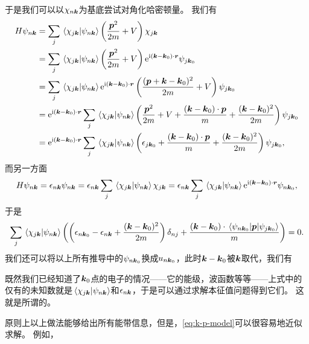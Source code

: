 于是我们可以以$\chi_{n \vb*{k}}$为基底尝试对角化哈密顿量。
我们有
\[
    \begin{aligned}
        H \psi_{n \vb*{k}} &= \sum_j \braket*{\chi_{j \vb*{k}}}{\psi_{n \vb*{k}}} \left( \frac{\vb*{p}^2}{2m} + V \right) \chi_{j \vb*{k}} \\
        &= \sum_j \braket*{\chi_{j \vb*{k}}}{\psi_{n \vb*{k}}} \left( \frac{\vb*{p}^2}{2m} + V \right) \mathrm{e}^{\mathrm{i} (\vb*{k} - \vb*{k}_0) \cdot \vb*{r}} \psi_{j \vb*{k}_0} \\
        &= \sum_j \braket*{\chi_{j \vb*{k}}}{\psi_{n \vb*{k}}} \mathrm{e}^{\mathrm{i} (\vb*{k} - \vb*{k}_0) \cdot \vb*{r}} \left( \frac{(\vb*{p} + \vb*{k} - \vb*{k}_0)^2}{2m} + V \right) \psi_{j \vb*{k}_0} \\
        &= \mathrm{e}^{\mathrm{i} (\vb*{k} - \vb*{k}_0) \cdot \vb*{r}} \sum_j \braket*{\chi_{j \vb*{k}}}{\psi_{n \vb*{k}}} \left( \frac{\vb*{p}^2}{2m} + V + \frac{(\vb*{k} - \vb*{k}_0) \cdot \vb*{p}}{m} + \frac{(\vb*{k} - \vb*{k}_0)^2}{2m} \right) \psi_{j \vb*{k}_0} \\
        &= \mathrm{e}^{\mathrm{i} (\vb*{k} - \vb*{k}_0) \cdot \vb*{r}} \sum_j \braket*{\chi_{j \vb*{k}}}{\psi_{n \vb*{k}}} \left( \epsilon_{j \vb*{k}_0} + \frac{(\vb*{k} - \vb*{k}_0) \cdot \vb*{p}}{m} + \frac{(\vb*{k} - \vb*{k}_0)^2}{2m} \right) \psi_{j \vb*{k}_0},
    \end{aligned}
\]
而另一方面
\[
    H \psi_{n \vb*{k}} = \epsilon_{n \vb*{k}} \psi_{n \vb*{k}} = \epsilon_{n \vb*{k}} \sum_j \braket*{\chi_{j \vb*{k}}}{\psi_{n \vb*{k}}} \chi_{j \vb*{k}} =  \epsilon_{n \vb*{k}} \sum_j \braket*{\chi_{j \vb*{k}}}{\psi_{n \vb*{k}}} \mathrm{e}^{\mathrm{i} (\vb*{k} - \vb*{k}_0) \cdot \vb*{r}} \psi_{n \vb*{k}_0},
\]
于是
\begin{equation}
    \sum_j \braket*{\chi_{j \vb*{k}}}{\psi_{n \vb*{k}}} \left( \left( \epsilon_{n \vb*{k}_0} - \epsilon_{n \vb*{k}} + \frac{(\vb*{k} - \vb*{k}_0)^2}{2m} \right) \delta_{nj} + \frac{(\vb*{k} - \vb*{k}_0) \cdot \mel{\psi_{n \vb*{k}_0}}{\vb*{p}}{\psi_{j \vb*{k}_0}}}{m} \right)  = 0.
    \label{eq:k-p-model}
\end{equation}
我们还可以将以上所有推导中的$\psi_{n \vb*{k}_0}$换成$u_{n \vb*{k}_0}$，此时$\vb*{k} - \vb*{k}_0$被$\vb*{k}$取代，我们有

既然我们已经知道了$\vb*{k}_0$点的电子的情况——它的能级，波函数等等——上式中的仅有的未知数就是$\braket*{\chi_{j \vb*{k}}}{\psi_{n \vb*{k}}}$和$\epsilon_{n \vb*{k}}$，于是可以通过求解本征值问题得到它们。
这就是所谓的。

原则上以上做法能够给出所有能带信息，但是，\eqref{eq:k-p-model}可以很容易地近似求解。
例如，

